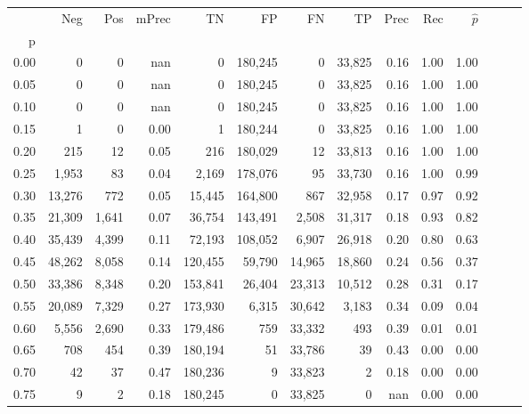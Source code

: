 \begin{tabular}{rrrrrrrrrrrrrr}
\toprule
{} &     Neg &    Pos & mPrec &       TN &       FP &      FN &      TP &  Prec &   Rec & $\hat{p}$ \\
p    &         &        &       &          &          &         &         &       &       &           \\
\midrule
0.00 &       0 &      0 &   nan &        0 &  180,245 &       0 &  33,825 &  0.16 &  1.00 &      1.00 \\
0.05 &       0 &      0 &   nan &        0 &  180,245 &       0 &  33,825 &  0.16 &  1.00 &      1.00 \\
0.10 &       0 &      0 &   nan &        0 &  180,245 &       0 &  33,825 &  0.16 &  1.00 &      1.00 \\
0.15 &       1 &      0 &  0.00 &        1 &  180,244 &       0 &  33,825 &  0.16 &  1.00 &      1.00 \\
0.20 &     215 &     12 &  0.05 &      216 &  180,029 &      12 &  33,813 &  0.16 &  1.00 &      1.00 \\
0.25 &   1,953 &     83 &  0.04 &    2,169 &  178,076 &      95 &  33,730 &  0.16 &  1.00 &      0.99 \\
0.30 &  13,276 &    772 &  0.05 &   15,445 &  164,800 &     867 &  32,958 &  0.17 &  0.97 &      0.92 \\
0.35 &  21,309 &  1,641 &  0.07 &   36,754 &  143,491 &   2,508 &  31,317 &  0.18 &  0.93 &      0.82 \\
0.40 &  35,439 &  4,399 &  0.11 &   72,193 &  108,052 &   6,907 &  26,918 &  0.20 &  0.80 &      0.63 \\
0.45 &  48,262 &  8,058 &  0.14 &  120,455 &   59,790 &  14,965 &  18,860 &  0.24 &  0.56 &      0.37 \\
0.50 &  33,386 &  8,348 &  0.20 &  153,841 &   26,404 &  23,313 &  10,512 &  0.28 &  0.31 &      0.17 \\
0.55 &  20,089 &  7,329 &  0.27 &  173,930 &    6,315 &  30,642 &   3,183 &  0.34 &  0.09 &      0.04 \\
0.60 &   5,556 &  2,690 &  0.33 &  179,486 &      759 &  33,332 &     493 &  0.39 &  0.01 &      0.01 \\
0.65 &     708 &    454 &  0.39 &  180,194 &       51 &  33,786 &      39 &  0.43 &  0.00 &      0.00 \\
0.70 &      42 &     37 &  0.47 &  180,236 &        9 &  33,823 &       2 &  0.18 &  0.00 &      0.00 \\
0.75 &       9 &      2 &  0.18 &  180,245 &        0 &  33,825 &       0 &   nan &  0.00 &      0.00 \\

\end{tabular}
